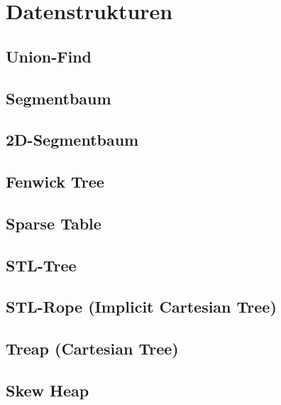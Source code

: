 \section{Datenstrukturen}

\subsection{Union-Find}


\subsection{Segmentbaum}


\subsection{2D-Segmentbaum}


\subsection{Fenwick Tree}



\subsection{Sparse Table}


\subsection{STL-Tree}


\subsection{STL-Rope (Implicit Cartesian Tree)}


\subsection{Treap (Cartesian Tree)}


\subsection{Skew Heap}

